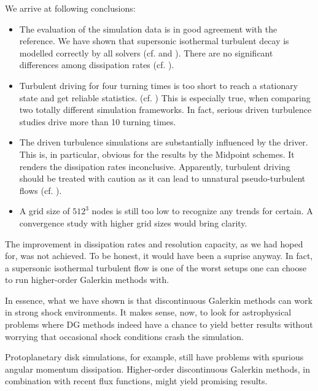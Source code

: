 We arrive at following conclusions:
\begin{itemize}
\item The evaluation of the simulation data is in good agreement with the
reference. We have shown that supersonic isothermal turbulent decay is modelled
correctly by all solvers (cf.  and
). There are no significant differences among dissipation
rates (cf. ).

\item Turbulent driving for four turning times is too short to reach a
stationary state and get reliable statistics. (cf.
) This is especially true, when
comparing two totally different simulation frameworks. In fact, serious driven
turbulence studies drive more than 10 turning times. 

\item The driven turbulence simulations are substantially influenced by the
driver. This is, in particular, obvious for the results by the Midpoint
schemes. It renders the dissipation rates inconclusive. Apparently, turbulent
driving should be treated with caution as it can lead to unnatural
pseudo-turbulent flows (cf. ).

\item A grid size of $512^3$ nodes is still too low to recognize any trends for
certain. A convergence study with higher grid sizes would bring clarity.
\end{itemize}

The improvement in dissipation rates and resolution capacity, as we had hoped
for, was not achieved. To be honest, it would have been a suprise anyway. In
fact, a supersonic isothermal turbulent flow is one of the worst setups one can
choose to run higher-order Galerkin methods with. 


In essence, what we have shown is that discontinuous Galerkin methods can work
in strong shock environments. It makes sense, now, to look for astrophysical
problems where DG methods indeed have a chance to yield better results
without worrying that occasional shock conditions crash the simulation.

Protoplanetary disk simulations, for example, still have problems with
spurious angular momentum dissipation. Higher-order discontinuous
Galerkin methods, in combination with recent flux functions, might yield
promising results.

